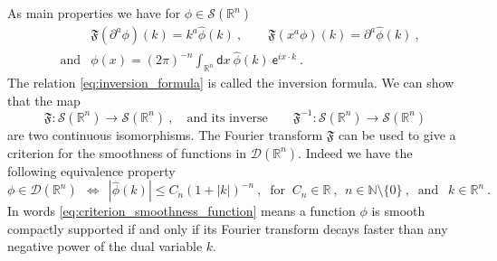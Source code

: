 \documentclass[11pt]{book}
\newcommand{\abs}[1]{\left|#1\right|}
\newcommand{\Dcal}{\mathcal{D}}
\newcommand{\Scal}{\mathcal{S}}
\newcommand{\Nbb}{\mathbb{N}}
\newcommand{\Rbb}{\mathbb{R}}
\newcommand{\Frak}{\mathfrak{F}}
\newcommand{\dsf}{\mathsf{d}}
\newcommand{\esf}{\mathsf{e}}
\theoremstyle{break}
\begin{document}
As main properties we have for $\phi \in \Scal(\Rbb^n)$ 
%
\begin{eqnarray}
&& \Frak(\partial^a \phi)(k) = k^a \hat{\phi}(k) \ , \qquad \Frak(x^a \phi)(k) = \partial^a \hat{\phi}(k) \ , \nonumber \\[6pt]
&\mbox{and}& \phi(x) = (2\pi)^{-n} \int_{\Rbb^n} \dsf x \ \hat{\phi}(k) \ \esf^{i x \cdot k} \ .
\label{eq:inversion_formula}
\end{eqnarray}
%
The relation \eqref{eq:inversion_formula} is called the inversion formula. We can show that the map
%
\begin{equation*}
\Frak : \Scal(\Rbb^n) \to \Scal(\Rbb^n) \ , \quad \mbox{and its inverse} \qquad \Frak^{-1} : \Scal(\Rbb^n) \to \Scal(\Rbb^n)
\end{equation*}
%
are two continuous isomorphisms. The Fourier transform $\Frak$ can be used to give a criterion for the smoothness of functions in $\Dcal(\Rbb^n)$. Indeed we have the following equivalence property
%
\begin{equation}
\phi \in \Dcal(\Rbb^n) \ \  \Longleftrightarrow  \ \ \abs{\hat{\phi}(k)} \leq C_n (1+\abs{k})^{-n} \ , \ \mbox{ for } \  C_n \in \Rbb \ , \ \ n \in \Nbb \setminus \{0\} \ , \ \mbox{ and } \ \ k \in \Rbb^n \ .
\label{eq:criterion_smoothness_function}
\end{equation}
%
In words \eqref{eq:criterion_smoothness_function} means a function $\phi$ is smooth compactly supported if and only if its Fourier transform decays faster than any negative power of the dual variable $k$.
\end{document}
